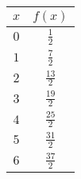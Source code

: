 \begin{tabular}{cc} \toprule
$x$  & $f(x)$         \\\midrule
$0$  & $\frac{1}{2}$  \\[6pt]
$1$  & $\frac{7}{2}$  \\[6pt]
$2$  & $\frac{13}{2}$ \\[6pt]
$3$  & $\frac{19}{2}$ \\[6pt]
$4$  & $\frac{25}{2}$ \\[6pt]
$5$  & $\frac{31}{2}$ \\[6pt]
$6$  & $\frac{37}{2}$ \\\bottomrule
\end{tabular}

